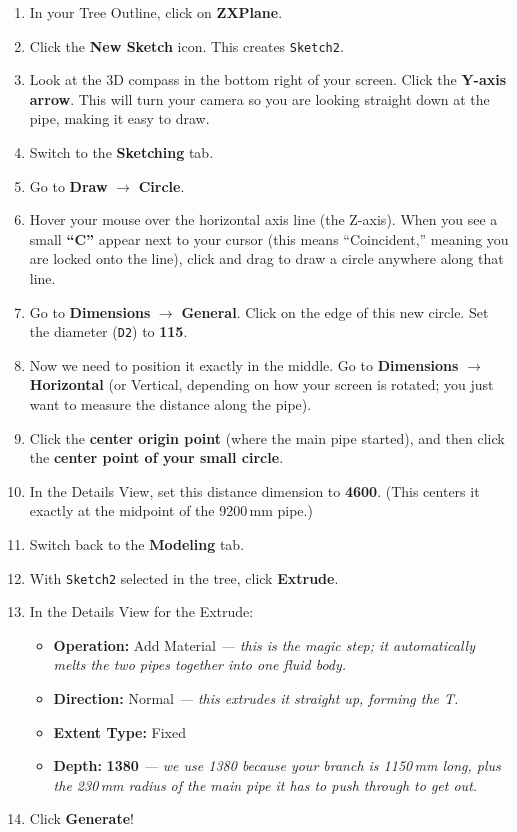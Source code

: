\documentclass[12pt,a4paper]{report}
\begin{document}
\begin{enumerate}
  \item In your Tree Outline, click on \textbf{ZXPlane}.
  \item Click the \textbf{New Sketch} icon. This creates \texttt{Sketch2}.
  \item Look at the 3D compass in the bottom right of your screen. Click the \textbf{Y-axis arrow}. This will turn your camera so you are looking straight down at the pipe, making it easy to draw.
  \item Switch to the \textbf{Sketching} tab.
  \item Go to \textbf{Draw} $\rightarrow$ \textbf{Circle}.
  \item Hover your mouse over the horizontal axis line (the Z-axis). When you see a small \textbf{``C''} appear next to your cursor (this means ``Coincident,'' meaning you are locked onto the line), click and drag to draw a circle anywhere along that line.
  \item Go to \textbf{Dimensions} $\rightarrow$ \textbf{General}. Click on the edge of this new circle. Set the diameter (\texttt{D2}) to \textbf{115}.
  \item Now we need to position it exactly in the middle. Go to \textbf{Dimensions} $\rightarrow$ \textbf{Horizontal} (or Vertical, depending on how your screen is rotated; you just want to measure the distance along the pipe).
  \item Click the \textbf{center origin point} (where the main pipe started), and then click the \textbf{center point of your small circle}.
  \item In the Details View, set this distance dimension to \textbf{4600}. (This centers it exactly at the midpoint of the 9200\,mm pipe.)
  \item Switch back to the \textbf{Modeling} tab.
  \item With \texttt{Sketch2} selected in the tree, click \textbf{Extrude}.
  \item In the Details View for the Extrude:
  \begin{itemize}
    \item \textbf{Operation:} Add Material \textit{--- this is the magic step; it automatically melts the two pipes together into one fluid body.}
    \item \textbf{Direction:} Normal \textit{--- this extrudes it straight up, forming the T.}
    \item \textbf{Extent Type:} Fixed
    \item \textbf{Depth:} \textbf{1380} \textit{--- we use 1380 because your branch is 1150\,mm long, plus the 230\,mm radius of the main pipe it has to push through to get out.}
  \end{itemize}
  \item Click \textbf{Generate}!
\end{enumerate}
\end{document}

